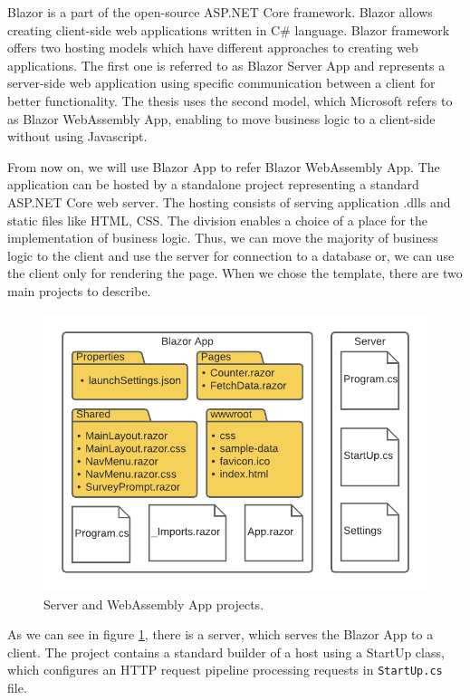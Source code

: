 Blazor is a part of the open-source ASP.NET Core framework.
Blazor allows creating client-side web applications written in C\# language.
Blazor framework offers two hosting models  which have different approaches to creating web applications. 
The first one is referred to as Blazor Server App and represents a server-side web application using specific communication between a client for better functionality.
The thesis uses the second model, which Microsoft refers to as Blazor WebAssembly App, enabling to move business logic to a client-side without using Javascript.
\par
From now on, we will use Blazor App to refer Blazor WebAssembly App.
The application can be hosted by a standalone project representing a standard ASP.NET Core web server.
The hosting consists of serving application .dlls and static files like HTML, CSS.
The division enables a choice of a place for the implementation of business logic.
Thus, we can move the majority of business logic to the client and use the server for connection to a database or, we can use the client only for rendering the page.
When we chose the template, there are two main projects to describe.
\par
\begin{figure}[!b]\centering
\includegraphics{./img/ProjectStructure}
\caption{Server and WebAssembly App projects.}
\label{img04:projects}
\end{figure} 
\par
As we can see in figure \ref{img04:projects}, there is a server, which serves the Blazor App to a client.
The project contains a standard builder of a host using a StartUp class, which configures an HTTP request pipeline processing requests in \texttt{StartUp.cs} file.
